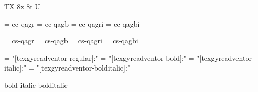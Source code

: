 
\ifx\ffdecl\undefined  \fi

\ffdecl [TG Adventor] {\rm \bf \it \bi} {\caps} {} {TX} {8z 8t U}

\def\caps{\ffsetV{caps}{-sc}\ffsetX}  \def\nocaps{\ffsetV{caps}{}\ffsetX}
\def\capsV{} 

\ismacro{}\ifttrue

   \font\tenrm = ec-qagr  \sizespec
   \font\tenbf = ec-qagb  \sizespec
   \font\tenit = ec-qagri \sizespec
   \font\tenbi = ec-qagbi \sizespec

   \def\ffnamegen{ec-qag\ffvarV\capsV}

\fi

\ismacro{}\iftrue

   \font\tenrm = cs-qagr  \sizespec
   \font\tenbf = cs-qagb  \sizespec
   \font\tenit = cs-qagri \sizespec
   \font\tenbi = cs-qagbi \sizespec

   \def\ffnamegen{cs-qag\ffvarV\capsV}
   

\fi

\ismacro{}\iftrue

   \font\tenrm = "[texgyreadventor-regular]:\fontfeatures"    \sizespec
   \font\tenbf = "[texgyreadventor-bold]:\fontfeatures"       \sizespec
   \font\tenit = "[texgyreadventor-italic]:\fontfeatures"     \sizespec
   \font\tenbi = "[texgyreadventor-bolditalic]:\fontfeatures" \sizespec

   \def\ffnamegen{"[texgyreadventor-\ffvarV]:\capsV\fontfeatures"} 

    {bold} {italic} {bolditalic}
   \def\caps{\ffsetV{caps}{+smcp;}\ffsetX}

\fi
\tenrm %

\ifx\loadmathfonts\relax \endinput \fi
\ifx\mathpreloaded X\else  \fi                     

\endinput
